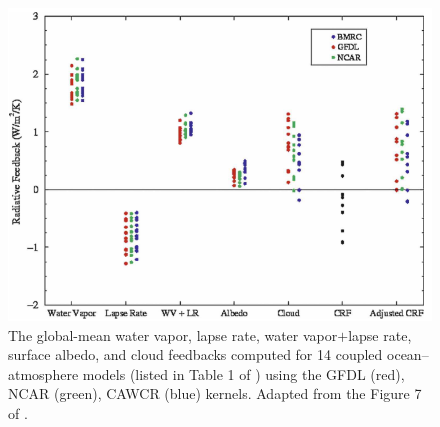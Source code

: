 \begin{figure}[ht]
	\centering
	\includegraphics[width=.8\linewidth]{figs/polar_amp/fig7_Soden2008}
	\caption{The global-mean water vapor, lapse rate, water vapor$+$lapse rate, surface albedo, and cloud feedbacks computed for 14 coupled ocean–atmosphere models (listed in Table 1 of \cite{Soden2006}) using the GFDL (red), NCAR (green), CAWCR (blue) kernels. Adapted from the Figure 7 of \cite{Soden2008}.}
	\label{fig:soden2008_3_kernels}
\end{figure}

